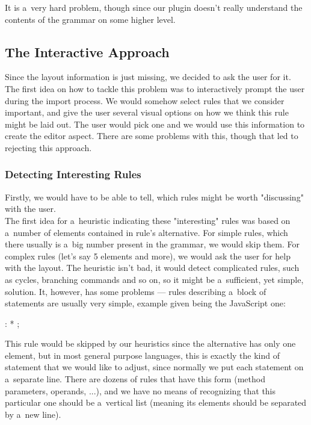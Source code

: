 It is a~very hard problem, though since our plugin doesn't really understand the contents of the grammar on some higher level.

\subsection{The Interactive Approach}

Since the layout information is just missing, we decided to ask the user for it.
The first idea on how to tackle this problem was to interactively prompt the user during the import process.
We would somehow select rules that we consider important, and give the user several visual options on how we think this rule might be laid out.
The user would pick one and we would use this information to create the editor aspect.
There are some problems with this, though that led to rejecting this approach.

\subsubsection{Detecting Interesting Rules}

Firstly, we would have to be able to tell, which rules might be worth "discussing" with the user.
\\

The first idea for a~heuristic indicating these "interesting" rules was based on a~number of elements contained in rule's alternative.
For simple rules, which there usually is a~big number present in the grammar, we would skip them.
For complex rules (let's say 5 elements and more), we would ask the user for help with the layout.
The heuristic isn't bad, it would detect complicated rules, such as cycles, branching commands and so on, so it might be a~sufficient, yet simple, solution.
It, however, has some problems --- rules describing a~block of statements are usually very simple, example given being the JavaScript one:

\begin{antlr}
	 : * ;
\end{antlr}

This rule would be skipped by our heuristics since the alternative has only one element, but in most general purpose languages, this is exactly the kind of statement that we would like to adjust, since normally we put each statement on a~separate line.
There are dozens of rules that have this form (method parameters, operands, ...), and we have no means of recognizing that this particular one should be a~vertical list (meaning its elements should be separated by a~new line).
\\

